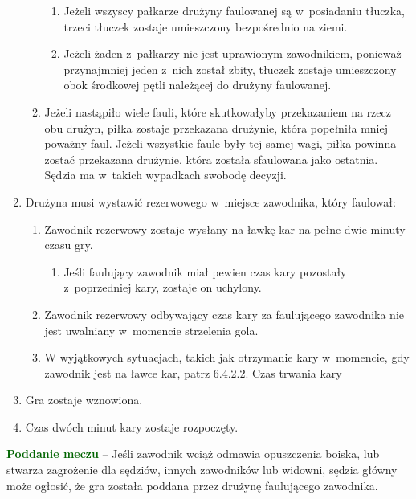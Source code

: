 \documentclass[12pt,a4paper]{article}
\newcommand\other[1]{\bgroup\textcolor{darkgreen}{\textbf{#1}}}
\begin{document}
\begin{enumerate}
\begin{enumerate}
		            \begin{enumerate}
			            \item
			                  Jeżeli wszyscy pałkarze drużyny faulowanej są w~posiadaniu
			                  tłuczka, trzeci tłuczek zostaje umieszczony bezpośrednio na ziemi.
			            \item
			                  Jeżeli żaden z~pałkarzy nie jest uprawionym zawodnikiem, ponieważ
			                  przynajmniej jeden z~nich został zbity, tłuczek zostaje
			                  umieszczony obok środkowej pętli należącej do drużyny faulowanej.
		            \end{enumerate}
		      \item
		            Jeżeli nastąpiło wiele fauli, które skutkowałyby przekazaniem na
		            rzecz obu drużyn, piłka zostaje przekazana drużynie, która popełniła
		            mniej poważny faul. Jeżeli wszystkie faule były tej samej wagi,
		            piłka powinna zostać przekazana drużynie, która została sfaulowana
		            jako ostatnia. Sędzia ma w~takich wypadkach swobodę decyzji.
	      \end{enumerate}
	\item
	      Drużyna musi wystawić rezerwowego w~miejsce zawodnika, który faulował:

	      \begin{enumerate}
		      \item
				Zawodnik rezerwowy zostaje wysłany na ławkę kar na pełne dwie minuty czasu gry.
				\begin{enumerate}
					\item
						Jeśli faulujący zawodnik miał pewien czas kary pozostały z~poprzedniej kary, zostaje on uchylony.
				\end{enumerate}
		      \item
		            Zawodnik rezerwowy odbywający czas kary za faulującego zawodnika nie
		            jest uwalniany w~momencie strzelenia gola.
		      \item
		            W wyjątkowych sytuacjach, takich jak otrzymanie kary w~momencie, gdy
		            zawodnik jest na ławce kar, patrz 6.4.2.2. Czas trwania kary
	      \end{enumerate}
	\item
	      Gra zostaje wznowiona.
	\item
	      Czas dwóch minut kary zostaje rozpoczęty.
\end{enumerate}

\other{Poddanie meczu} -- Jeśli zawodnik wciąż odmawia opuszczenia boiska,
lub stwarza zagrożenie dla sędziów, innych zawodników lub widowni,
sędzia główny może ogłosić, że gra została poddana przez drużynę
faulującego zawodnika.
\end{document}
